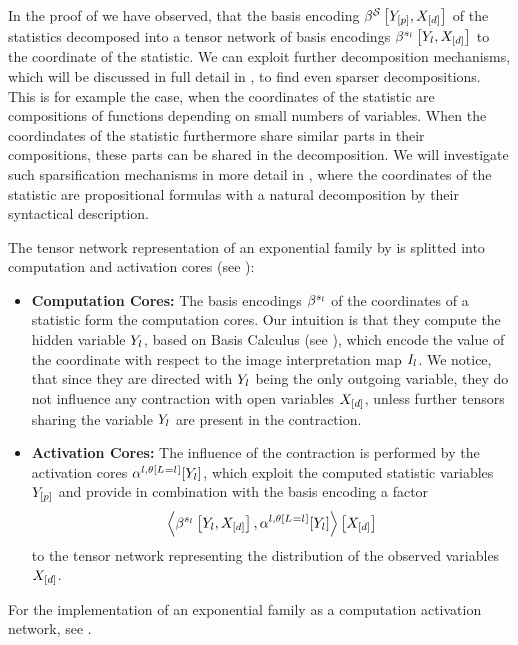 In the proof of  we have observed, that the basis encoding $\beta^{\mathcal{S}}\left[Y_{[p]},X_{[d]}\right]$ of the statistics decomposed into a tensor network of basis encodings $\beta^{s_{l}}\left[Y_{l},X_{[d]}\right]$ to the coordinate of the statistic.
We can exploit further decomposition mechanisms, which will be discussed in full detail in , to find even sparser decompositions.
This is for example the case, when the coordinates of the statistic are compositions of functions depending on small numbers of variables.
When the coordindates of the statistic furthermore share similar parts in their compositions, these parts can be shared in the decomposition.
We will investigate such sparsification mechanisms in more detail in , where the coordinates of the statistic are propositional formulas with a natural decomposition by their syntactical description.


The tensor network representation of an exponential family by  is splitted into computation and activation cores (see ):
\begin{itemize}
    \item \textbf{Computation Cores:} The basis encodings $\beta^{s_{l}}$ of the coordinates of a statistic form the computation cores.
    Our intuition is that they compute the hidden variable $Y_{l}$, based on Basis Calculus (see ), which encode the value of the coordinate with respect to the image interpretation map $I_{l}$.
    We notice, that since they are directed with $Y_{l}$ being the only outgoing variable, they do not influence any contraction with open variables $X_{[d]}$, unless further tensors sharing the variable $Y_{l}$ are present in the contraction.
    \item \textbf{Activation Cores:} The influence of the contraction is performed by the activation cores $\alpha^{l,\theta\left[L_{}=l_{}\right]}[Y_{l}]$, which exploit the computed statistic variables $Y_{[p]}$ and provide in combination with the basis encoding a factor
    \begin{align*}
        \left\langle \beta^{s_{l}}\left[Y_{l},X_{[d]}\right],\alpha^{l,\theta\left[L_{}=l_{}\right]}[Y_{l}]\right\rangle \left[ X_{[d]} \right]
    \end{align*}
    to the tensor network representing the distribution of the observed variables $X_{[d]}$.
\end{itemize}
For the implementation of an exponential family as a computation activation network, see . %

